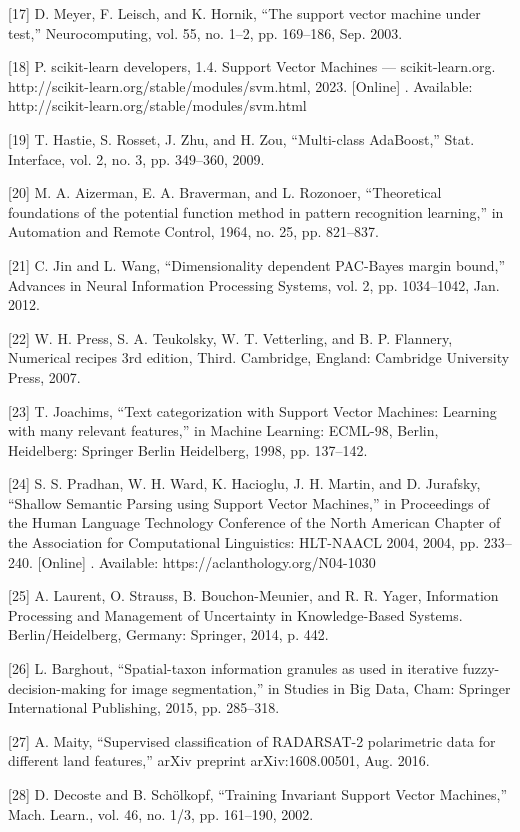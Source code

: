\documentclass[sn-mathphys-num]{sn-jnl}%
\begin{document}
[17] D. Meyer, F. Leisch, and K. Hornik, “The support vector machine under test,” Neurocomputing, vol. 55, no. 1–2, pp. 169–186, Sep. 2003.

[18] P. scikit-learn developers, 1.4. Support Vector Machines — scikit-learn.org. http://scikit-learn.org/stable/modules/svm.html, 2023. [Online] . Available: http://scikit-learn.org/stable/modules/svm.html

[19] T. Hastie, S. Rosset, J. Zhu, and H. Zou, “Multi-class AdaBoost,” Stat. Interface, vol. 2, no. 3, pp. 349–360, 2009.

[20] M. A. Aizerman, E. A. Braverman, and L. Rozonoer, “Theoretical foundations of the potential function method in pattern recognition learning,” in Automation and Remote Control, 1964, no. 25, pp. 821–837.

[21] C. Jin and L. Wang, “Dimensionality dependent PAC-Bayes margin bound,” Advances in Neural Information Processing Systems, vol. 2, pp. 1034–1042, Jan. 2012.

[22] W. H. Press, S. A. Teukolsky, W. T. Vetterling, and B. P. Flannery, Numerical recipes 3rd edition, Third. Cambridge, England: Cambridge University Press, 2007.

[23] T. Joachims, “Text categorization with Support Vector Machines: Learning with many relevant features,” in Machine Learning: ECML-98, Berlin, Heidelberg: Springer Berlin Heidelberg, 1998, pp. 137–142.

[24] S. S. Pradhan, W. H. Ward, K. Hacioglu, J. H. Martin, and D. Jurafsky, “Shallow Semantic Parsing using Support Vector Machines,” in Proceedings of the Human Language Technology Conference of the North American Chapter of the Association for Computational Linguistics: HLT-NAACL 2004, 2004, pp. 233–240. [Online] . Available: https://aclanthology.org/N04-1030

[25] A. Laurent, O. Strauss, B. Bouchon-Meunier, and R. R. Yager, Information Processing and Management of Uncertainty in Knowledge-Based Systems. Berlin/Heidelberg, Germany: Springer, 2014, p. 442.

[26] L. Barghout, “Spatial-taxon information granules as used in iterative fuzzy-decision-making for image segmentation,” in Studies in Big Data, Cham: Springer International Publishing, 2015, pp. 285–318.

[27] A. Maity, “Supervised classification of RADARSAT-2 polarimetric data for different land features,” arXiv preprint arXiv:1608.00501, Aug. 2016.

[28] D. Decoste and B. Schölkopf, “Training Invariant Support Vector Machines,” Mach. Learn., vol. 46, no. 1/3, pp. 161–190, 2002.
\end{document}
